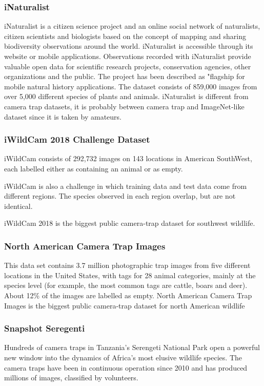 \subsubsection{iNaturalist}
iNaturalist is a citizen science project and an online social network of naturalists, citizen scientists and biologists based on the concept of mapping and sharing biodiversity observations around the world. iNaturalist is accessible through its website or mobile applications. Observations recorded with iNaturalist provide valuable open data for scientific research projects, conservation agencies, other organizations and the public. The project has been described as "flagship for mobile natural history applications.
The dataset consists of 859,000 images from over 5,000 different species of plants and animals.
iNaturalist is different from camera trap datasets, it is probably between camera trap and ImageNet-like dataset since it is taken by amateurs.

\subsubsection{iWildCam 2018 Challenge Dataset}
iWildCam\cite{iwildcam2019} consists of 292,732 images on 143 locations in American SouthWest, each labelled either as containing an animal or as empty.

iWildCam is also a challenge in which training data and test data come from different regions. The species observed in each region overlap, but are not identical.

iWildCam 2018 is the biggest public camera-trap dataset for southwest wildlife.

\subsubsection{North American Camera Trap Images}
This data set\cite{north_american_camera_trap_and_resnet18} contains 3.7 million photographic trap images from five different locations in the United States, with tags for 28 animal categories, mainly at the species level (for example, the most common tags are cattle, boars and deer). About 12\% of the images are labelled as empty.
North American Camera Trap Images is the biggest public camera-trap dataset for north American wildlife


\pagebreak\subsubsection{Snapshot Seregenti}
Hundreds of camera traps in Tanzania's Serengeti National Park open a powerful new window into the dynamics of Africa's most elusive wildlife species. The camera traps have been in continuous operation since 2010 and has produced millions of images, classified by volunteers.

